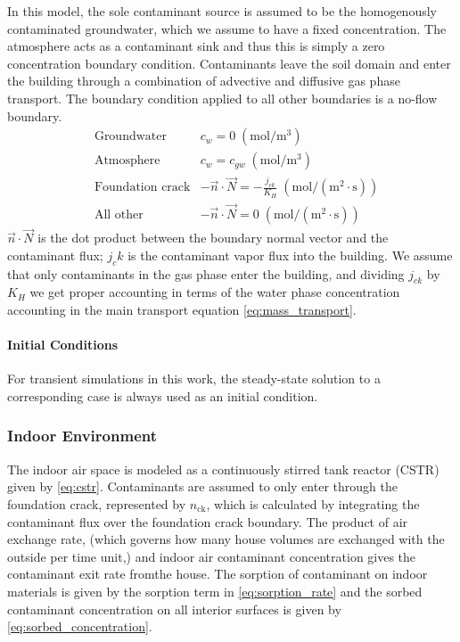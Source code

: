 In this model, the sole contaminant source is assumed to be the homogenously contaminated groundwater, which we assume to have a fixed concentration.
The atmosphere acts as a contaminant sink and thus this is simply a zero concentration boundary condition.
Contaminants leave the soil domain and enter the building through a combination of advective and diffusive gas phase transport.
The boundary condition applied to all other boundaries is a no-flow boundary.
\begin{align}
  &\text{Groundwater} & c_w = 0 \; \mathrm{(mol/m^3)} \\
  &\text{Atmosphere} & c_w = c_{gw} \; \mathrm{(mol/m^3)} \\
  &\text{Foundation crack} & -\vec{n} \cdot \vec{N} = - \frac{j_{ck}}{K_H} \; \mathrm{(mol/(m^2 \cdot s))}\\
  &\text{All other} & -\vec{n} \cdot \vec{N} = 0 \; \mathrm{(mol/(m^2 \cdot s))}
\end{align}
$\vec{n} \cdot \vec{N}$ is the dot product between the boundary normal vector and the contaminant flux;
$j_ck$ is the contaminant vapor flux into the building.
We assume that only contaminants in the gas phase enter the building, and dividing $j_{ck}$ by $K_H$ we get proper accounting in terms of the water phase concentration accounting in the main transport equation \ref{eq:mass_transport}.\par

\paragraph{Initial Conditions}

For transient simulations in this work, the steady-state solution to a corresponding case is always used as an initial condition.

\subsubsection{Indoor Environment}\label{sec:indoor_environment}

The indoor air space is modeled as a continuously stirred tank reactor (CSTR) given by \eqref{eq:cstr}.
Contaminants are assumed to only enter through the foundation crack, represented by $n_\mathrm{ck}$, which is calculated by integrating the contaminant flux over the foundation crack boundary.
The product of air exchange rate, (which governs how many house volumes are exchanged with the outside per time unit,) and indoor air contaminant concentration gives the contaminant exit rate fromthe house.
The sorption of contaminant on indoor materials is given by the sorption term in \eqref{eq:sorption_rate} and the sorbed contaminant concentration on all interior surfaces is given by \eqref{eq:sorbed_concentration}.

